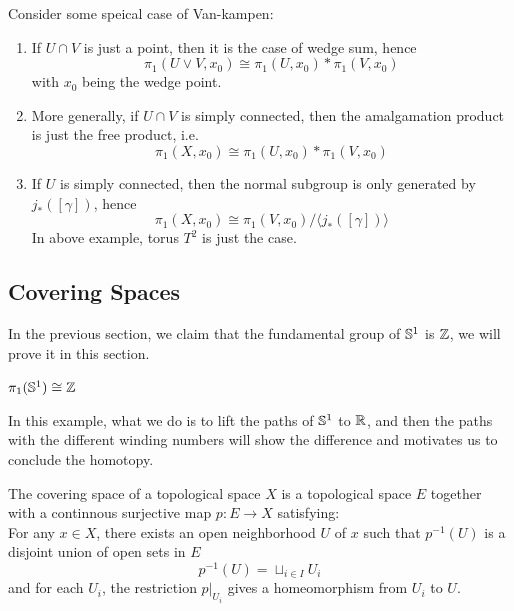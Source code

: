 \documentclass[12pt,a4paper]{article}
\begin{document}
\begin{remark}
    Consider some speical case of Van-kampen:
    \begin{enumerate}
        \item If \(U \cap V\) is just a point, then it is the case of wedge sum, hence
        \[\pi_1(U\vee V,x_0) \cong \pi_1(U,x_0) * \pi_1(V,x_0)\]
        with \(x_0\) being the wedge point.

        \item More generally, if \(U \cap V\) is simply connected, then the amalgamation product is just the free product, i.e.
        \[\pi_1(X,x_0) \cong \pi_1(U,x_0) * \pi_1(V,x_0)\]

        \item If \(U\) is simply connected, then the normal subgroup is only generated by \(j_*([\gamma])\), hence
        \[\pi_1(X,x_0) \cong \pi_1(V,x_0) / \langle j_*([\gamma]) \rangle\]
        In above example, torus \(T^2\) is just the case.


    \end{enumerate}
\end{remark}


\subsection{Covering Spaces}

In the previous section, we claim that the fundamental group of \(\mathbb{S}^1\) is \(\mathbb{Z}\), we will prove it in this section.

\begin{theorem}
    \(\pi_1(\mathbb{S}^1) \cong \mathbb{Z}\)
\end{theorem}

In this example, what we do is to lift the paths of \(\mathbb{S}^1\) to \(\mathbb{R}\), and then the paths with the different winding numbers will show the difference and motivates us to conclude the homotopy.

\begin{definitionplain}
    The covering space of a topological space \(X\) is a topological space \(E\) together with a continnous surjective map \(p:E \to X\) satisfying:\\
    For any \(x \in X\), there exists an open neighborhood \(U\) of \(x\) such that \(p^{-1}(U)\) is a disjoint union of open sets in \(E\)
    \[p^{-1}(U) = \sqcup_{i \in I}U_i\]
    and for each \(U_i\), the restriction \(p|_{U_i}\) gives a homeomorphism from \(U_i\) to \(U\).
\end{definitionplain}
\end{document}
